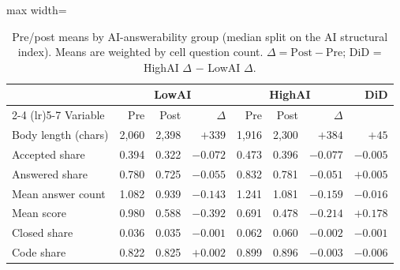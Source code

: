 \begin{table}[ht]
\centering
\caption{Pre/post means by AI-answerability group (median split on the AI
structural index). Means are weighted by cell question count.
$\Delta = \text{Post} - \text{Pre}$;
DiD = HighAI $\Delta$ $-$ LowAI $\Delta$.}
\label{tab:prepost_resolvability_by_ai_group}
\footnotesize
\setlength{\tabcolsep}{4pt}
\begin{adjustbox}{max width=\textwidth}
\begin{tabular}{lrrrrrrr}
\toprule
 & \multicolumn{3}{c}{LowAI} & \multicolumn{3}{c}{HighAI} & DiD \\
\cmidrule(lr){2-4} \cmidrule(lr){5-7}
Variable & Pre & Post & $\Delta$ & Pre & Post & $\Delta$ & \\
\midrule
Body length (chars)  & 2{,}060 & 2{,}398 & $+339$  & 1{,}916 & 2{,}300 & $+384$  & $+45$    \\
Accepted share       & 0.394   & 0.322   & $-0.072$ & 0.473   & 0.396   & $-0.077$ & $-0.005$ \\
Answered share       & 0.780   & 0.725   & $-0.055$ & 0.832   & 0.781   & $-0.051$ & $+0.005$ \\
Mean answer count    & 1.082   & 0.939   & $-0.143$ & 1.241   & 1.081   & $-0.159$ & $-0.016$ \\
Mean score           & 0.980   & 0.588   & $-0.392$ & 0.691   & 0.478   & $-0.214$ & $+0.178$ \\
Closed share         & 0.036   & 0.035   & $-0.001$ & 0.062   & 0.060   & $-0.002$ & $-0.001$ \\
Code share           & 0.822   & 0.825   & $+0.002$ & 0.899   & 0.896   & $-0.003$ & $-0.006$ \\
\bottomrule
\end{tabular}
\end{adjustbox}
\end{table}
